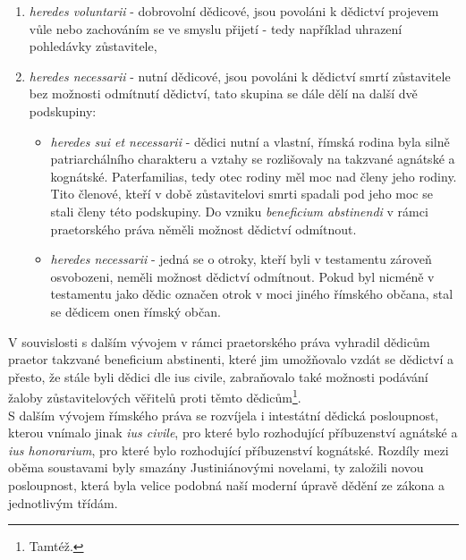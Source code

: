 \documentclass{article}
\begin{document}
\begin{enumerate}
\item \textit{heredes voluntarii} - dobrovolní dědicové, jsou povoláni k dědictví projevem vůle nebo zachováním se ve smyslu přijetí - tedy například uhrazení pohledávky zůstavitele,
\item \textit{heredes necessarii} - nutní dědicové, jsou povoláni k dědictví smrtí zůstav\-itele bez možnosti odmítnutí dědictví, tato skupina se dále dělí na další dvě podskupiny:
\begin{itemize}
\item \textit{heredes sui et necessarii} - dědici nutní a vlastní, římská rodina byla silně patriarchálního charakteru a vztahy se rozlišovaly na takzvané agnátské a kognátské. Paterfamilias, tedy otec rodiny měl moc nad členy jeho rodiny. Tito členové, kteří v době zůstavitelovi smrti spadali pod jeho moc se stali členy této podskupiny. Do vzniku \textit{beneficium abstinendi} v rámci praetorského práva něměli možnost dědictví odmítnout.
\item \textit{heredes necessarii} - jedná se o otroky, kteří byli v testamentu zároveň osvobozeni, neměli možnost dědictví odmítnout. Pokud byl nicméně v testamentu jako dědic označen otrok v moci jiného římského občana, stal se dědicem onen římský občan.
\end{itemize}
\end{enumerate}

\vspace{5 mm}



V souvislosti s dalším vývojem v rámci praetorského práva vyhradil dědicům praetor takzvané beneficium abstinenti, které jim umožňovalo vzdát se dědictví a přesto, že stále byli dědici dle ius civile, zabraňovalo také možnosti podávání žaloby zůstavitelových věřitelů proti těmto dědicům\footnote{Tamtéž.}.\\

S dalším vývojem římského práva se rozvíjela i intestátní dědická posloupnost, kterou vnímalo jinak \textit{ius civile}, pro které bylo rozhodující příbuzenství agnátské a \textit{ius honorarium}, pro které bylo rozhodující příbuzenství kognátské. Rozdíly mezi oběma soustavami byly smazány Justiniánovými novelami, ty založili novou posloupnost, která byla velice podobná naší moderní úpravě dědění ze zákona a jednotlivým třídám.\\
\end{document}
